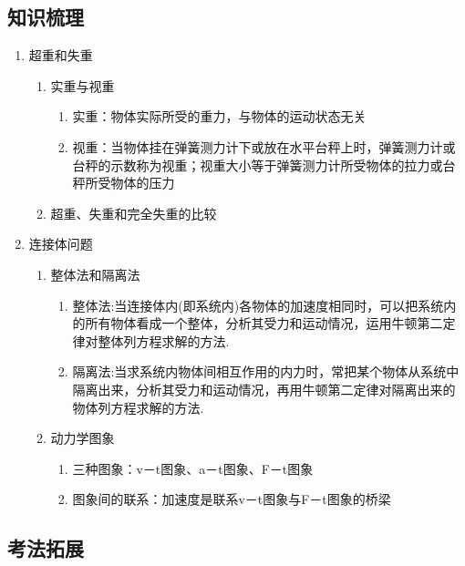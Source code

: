 \documentclass[cn,11pt]{elegantbook}
\begin{document}
      \subsection{知识梳理}
      \begin{enumerate}
         \item 超重和失重
         \begin{enumerate}
            \item 实重与视重
            \begin{enumerate}
               \item 实重：物体实际所受的重力，与物体的运动状态无关
               \item 视重：当物体挂在弹簧测力计下或放在水平台秤上时，弹簧测力计或台秤的示数称为视重；视重大小等于弹簧测力计所受物体的拉力或台秤所受物体的压力
            \end{enumerate}
            \item 超重、失重和完全失重的比较
            
         \end{enumerate}
         \item 连接体问题
         \begin{enumerate}
            \item 整体法和隔离法
            \begin{enumerate}
               \item 整体法:当连接体内(即系统内)各物体的加速度相同时，可以把系统内的所有物体看成一个整体，分析其受力和运动情况，运用牛顿第二定律对整体列方程求解的方法.
               \item 隔离法:当求系统内物体间相互作用的内力时，常把某个物体从系统中隔离出来，分析其受力和运动情况，再用牛顿第二定律对隔离出来的物体列方程求解的方法.
            \end{enumerate}
            \item 动力学图象
            \begin{enumerate}
               \item 三种图象：v－t图象、a－t图象、F－t图象
               \item 图象间的联系：加速度是联系v－t图象与F－t图象的桥梁
            \end{enumerate}
         \end{enumerate}
      \end{enumerate}
      \subsection{考法拓展}
\end{document}
